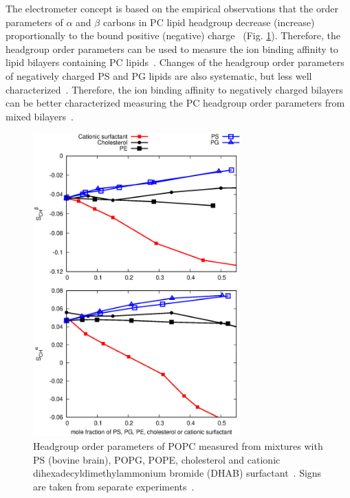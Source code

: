 \documentclass[journal=jpcbfk,manuscript=article]{achemso}
\begin{document}
The electrometer concept is based on the empirical observations that
the order parameters of $\alpha$ and $\beta$ carbons in PC lipid headgroup
decrease (increase) proportionally to the bound positive (negative) 
charge~\cite{akutsu81,altenbach84,seelig87,scherer89} (Fig. \ref{HGorderparametersPCvsPEPSPGchol}). 
Therefore, the headgroup order parameters can be used to measure the
ion binding affinity to lipid bilayers containing PC
lipids~\cite{akutsu81,altenbach84,borle85,seelig87,macdonald87,roux90}.
Changes of the headgroup order parameters of negatively charged PS and PG lipids
are also systematic, but less well characterized~\cite{borle85,macdonald87,roux86,roux90}.
Therefore, the ion binding affinity to negatively charged bilayers
can be better characterized measuring the PC headgroup order parameters from 
mixed bilayers~\cite{borle85,roux86,macdonald87,roux90,roux91}.
\begin{figure}[]
  \centering
  \includegraphics[width=8.0cm]{../Figs/HGorderparametersPCvsPEPSPGchol.eps}
  \caption{\label{HGorderparametersPCvsPEPSPGchol}
    Headgroup order parameters of POPC measured from mixtures with
    PS (bovine brain), POPG, POPE, cholesterol and cationic dihexadecyldimethylammonium bromide (DHAB) surfactant~\cite{scherer87,scherer89,ferreira13}.
    Signs are taken from separate experiments~\cite{ollila16,ferreira16}.
  }
\end{figure}
\end{document}
